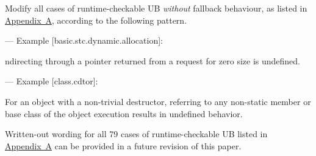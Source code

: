 Modify all cases of runtime-checkable UB \emph{without} fallback behaviour, as listed in \hyperref[appendix]{Appendix~A}, according to the following pattern. 

--- Example [basic.stc.dynamic.allocation]:

\begin{adjustwidth}{0.5cm}{0.5cm}
ndirecting through a pointer  returned from a request for zero size is undefined.
\end{adjustwidth}

--- Example [class.cdtor]:

\begin{adjustwidth}{0.5cm}{0.5cm}
For an object with a non-trivial destructor, referring to any non-static member or base class of the object  execution results in undefined behavior.
\end{adjustwidth}

Written-out wording for all 79 cases of runtime-checkable UB listed in \hyperref[appendix]{Appendix~A} can be provided in a future revision of this paper.


